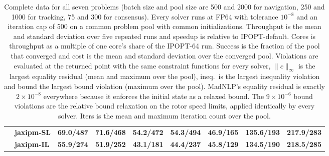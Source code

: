 \begin{table}[p]
{\begin{tabular}{@{}l l r r r r r r r@{}}
 & \textbf{jaxipm-SL} & \textbf{69.0/487} & \textbf{71.6/468} & \textbf{54.2/472} & \textbf{54.3/494} & \textbf{46.9/165} & \textbf{135.6/193} & \textbf{217.9/283} \\
 & \textbf{jaxipm-IL} & \textbf{55.9/274} & \textbf{51.9/252} & \textbf{43.1/181} & \textbf{44.4/237} & \textbf{45.8/129} & \textbf{134.5/190} & \textbf{218.5/285} \\
\bottomrule
\end{tabular}}
\caption{\scriptsize Complete data for all seven problems (batch size and pool size are 500 and 2000 for navigation, 250 and 1000 for tracking, 75 and 300 for consensus). Every solver runs at FP64 with tolerance $10^{-8}$ and an iteration cap of 500 on a common problem pool with common initializations. Throughput is the mean and standard deviation over five repeated runs and speedup is relative to IPOPT-default. Cores is throughput as a multiple of one core's share of the IPOPT-64 run. Success is the fraction of the pool that converged and cost is the mean and standard deviation over the converged pool. Violations are evaluated at the returned point with the same constraint functions for every solver, $\lVert c\rVert_\infty$ is the largest equality residual (mean and maximum over the pool), ineq.\ is the largest inequality violation and bound the largest bound violation (maximum over the pool). MadNLP's equality residual is exactly $2\times10^{-8}$ everywhere because it enforces the initial state as a relaxed bound. The $9\times10^{-6}$ bound violations are the relative bound relaxation on the rotor speed limits, applied identically by every solver. Iters is the mean and maximum iteration count over the pool.}
\label{tab:full-data}
\end{table}
